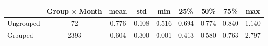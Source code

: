 \begin{tabular}{lcccccccc}
\toprule
{} &  Group $ \times $ Month &   mean &    std &    min &    25\% &    50\% &    75\% &    max \\
\midrule
Ungrouped &                      72 &  0.776 &  0.108 &  0.516 &  0.694 &  0.774 &  0.840 &  1.140 \\
Grouped   &                    2393 &  0.604 &  0.300 &  0.001 &  0.413 &  0.580 &  0.763 &  2.797 \\
\bottomrule
\end{tabular}
